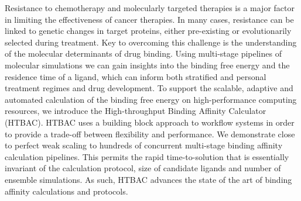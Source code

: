 Resistance to chemotherapy and molecularly targeted therapies is a major
factor in limiting the effectiveness of cancer therapies. In many cases,
resistance can be linked to genetic changes in target proteins, either
pre-existing or evolutionarily selected during treatment. Key to overcoming
this challenge is the understanding of the molecular determinants of drug
binding. Using multi-stage pipelines of molecular simulations we can gain
insights into the binding free energy and the residence time of a ligand,
which can inform both stratified and personal treatment regimes and drug
development.
To support the scalable, adaptive and automated calculation of the binding
free energy on high-performance computing resources, we introduce the
High-throughput Binding Affinity Calculator (HTBAC). HTBAC uses a building
block approach to workflow systems in order to provide a trade-off between
flexibility and performance. We demonstrate close to perfect weak scaling to
hundreds of concurrent multi-stage binding affinity calculation pipelines.
This permits the rapid time-to-solution that is essentially invariant of the
calculation protocol, size of candidate ligands and number of ensemble
simulations. As such, HTBAC advances the state of the art of binding affinity
calculations and protocols.